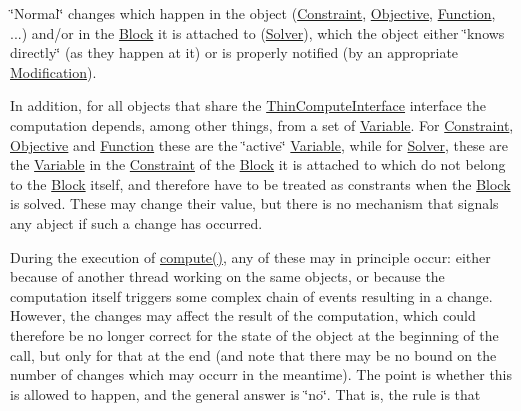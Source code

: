 \begin{DoxyItemize}
\item \char`\"{}\+Normal\char`\"{} changes which happen in the object (\mbox{\hyperlink{class_s_m_spp__di__unipi__it_1_1_constraint}{Constraint}}, \mbox{\hyperlink{class_s_m_spp__di__unipi__it_1_1_objective}{Objective}}, \mbox{\hyperlink{class_s_m_spp__di__unipi__it_1_1_function}{Function}}, ...) and/or in the \mbox{\hyperlink{class_s_m_spp__di__unipi__it_1_1_block}{Block}} it is attached to (\mbox{\hyperlink{class_s_m_spp__di__unipi__it_1_1_solver}{Solver}}), which the object either \char`\"{}knows directly\char`\"{} (as they happen at it) or is properly notified (by an appropriate \mbox{\hyperlink{class_s_m_spp__di__unipi__it_1_1_modification}{Modification}}).
\item In addition, for all objects that share the \mbox{\hyperlink{class_s_m_spp__di__unipi__it_1_1_thin_compute_interface}{Thin\+Compute\+Interface}} interface the computation depends, among other things, from a set of \mbox{\hyperlink{class_s_m_spp__di__unipi__it_1_1_variable}{Variable}}. For \mbox{\hyperlink{class_s_m_spp__di__unipi__it_1_1_constraint}{Constraint}}, \mbox{\hyperlink{class_s_m_spp__di__unipi__it_1_1_objective}{Objective}} and \mbox{\hyperlink{class_s_m_spp__di__unipi__it_1_1_function}{Function}} these are the \char`\"{}active\char`\"{} \mbox{\hyperlink{class_s_m_spp__di__unipi__it_1_1_variable}{Variable}}, while for \mbox{\hyperlink{class_s_m_spp__di__unipi__it_1_1_solver}{Solver}}, these are the \mbox{\hyperlink{class_s_m_spp__di__unipi__it_1_1_variable}{Variable}} in the \mbox{\hyperlink{class_s_m_spp__di__unipi__it_1_1_constraint}{Constraint}} of the \mbox{\hyperlink{class_s_m_spp__di__unipi__it_1_1_block}{Block}} it is attached to which do not belong to the \mbox{\hyperlink{class_s_m_spp__di__unipi__it_1_1_block}{Block}} itself, and therefore have to be treated as constrants when the \mbox{\hyperlink{class_s_m_spp__di__unipi__it_1_1_block}{Block}} is solved. These may change their value, but there is no mechanism that signals any abject if such a change has occurred.
\end{DoxyItemize}

During the execution of \mbox{\hyperlink{class_s_m_spp__di__unipi__it_1_1_thin_compute_interface_a00fd6363d98ea46bcc273842b327d050}{compute()}}, any of these may in principle occur\+: either because of another thread working on the same objects, or because the computation itself triggers some complex chain of events resulting in a change. However, the changes may affect the result of the computation, which could therefore be no longer correct for the state of the object at the beginning of the call, but only for that at the end (and note that there may be no bound on the number of changes which may occurr in the meantime). The point is whether this is allowed to happen, and the general answer is \char`\"{}no\char`\"{}. That is, the rule is that

